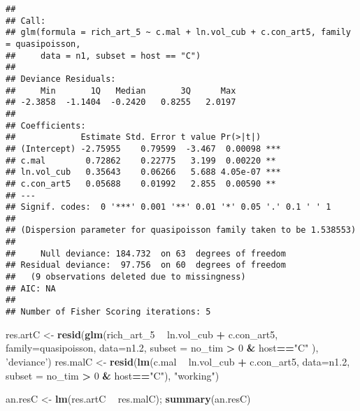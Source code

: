 \documentclass[]{article}
\newenvironment{Shaded}{\begin{snugshade}}{\end{snugshade}}
\newcommand{\KeywordTok}[1]{\textcolor[rgb]{0.13,0.29,0.53}{\textbf{#1}}}
\newcommand{\DataTypeTok}[1]{\textcolor[rgb]{0.13,0.29,0.53}{#1}}
\newcommand{\DecValTok}[1]{\textcolor[rgb]{0.00,0.00,0.81}{#1}}
\newcommand{\StringTok}[1]{\textcolor[rgb]{0.31,0.60,0.02}{#1}}
\newcommand{\OperatorTok}[1]{\textcolor[rgb]{0.81,0.36,0.00}{\textbf{#1}}}
\newcommand{\NormalTok}[1]{#1}
\begin{document}
\begin{verbatim}
## 
## Call:
## glm(formula = rich_art_5 ~ c.mal + ln.vol_cub + c.con_art5, family = quasipoisson, 
##     data = n1, subset = host == "C")
## 
## Deviance Residuals: 
##     Min       1Q   Median       3Q      Max  
## -2.3858  -1.1404  -0.2420   0.8255   2.0197  
## 
## Coefficients:
##             Estimate Std. Error t value Pr(>|t|)    
## (Intercept) -2.75955    0.79599  -3.467  0.00098 ***
## c.mal        0.72862    0.22775   3.199  0.00220 ** 
## ln.vol_cub   0.35643    0.06266   5.688 4.05e-07 ***
## c.con_art5   0.05688    0.01992   2.855  0.00590 ** 
## ---
## Signif. codes:  0 '***' 0.001 '**' 0.01 '*' 0.05 '.' 0.1 ' ' 1
## 
## (Dispersion parameter for quasipoisson family taken to be 1.538553)
## 
##     Null deviance: 184.732  on 63  degrees of freedom
## Residual deviance:  97.756  on 60  degrees of freedom
##   (9 observations deleted due to missingness)
## AIC: NA
## 
## Number of Fisher Scoring iterations: 5
\end{verbatim}

\begin{Shaded}
\begin{Highlighting}[]
\NormalTok{res.artC <-}\StringTok{ }\KeywordTok{resid}\NormalTok{(}\KeywordTok{glm}\NormalTok{(rich_art_}\DecValTok{5} \OperatorTok{~}\StringTok{ }\NormalTok{ln.vol_cub }\OperatorTok{+}\StringTok{ }\NormalTok{c.con_art5,}
           \DataTypeTok{family=}\NormalTok{quasipoisson, }\DataTypeTok{data=}\NormalTok{n1.}\DecValTok{2}\NormalTok{, }\DataTypeTok{subset =}\NormalTok{ no_tim }\OperatorTok{>}\StringTok{ }\DecValTok{0} \OperatorTok{&}\StringTok{ }\NormalTok{host}\OperatorTok{==}\StringTok{"C"}\NormalTok{ ), }\StringTok{'deviance'}\NormalTok{)}
\NormalTok{res.malC <-}\StringTok{ }\KeywordTok{resid}\NormalTok{(}\KeywordTok{lm}\NormalTok{(c.mal }\OperatorTok{~}\StringTok{ }\NormalTok{ln.vol_cub }\OperatorTok{+}\StringTok{ }\NormalTok{c.con_art5,}
           \DataTypeTok{data=}\NormalTok{n1.}\DecValTok{2}\NormalTok{, }\DataTypeTok{subset =}\NormalTok{ no_tim }\OperatorTok{>}\StringTok{ }\DecValTok{0} \OperatorTok{&}\StringTok{ }\NormalTok{host}\OperatorTok{==}\StringTok{"C"}\NormalTok{), }\StringTok{"working"}\NormalTok{)}

\NormalTok{an.resC <-}\StringTok{ }\KeywordTok{lm}\NormalTok{(res.artC }\OperatorTok{~}\StringTok{ }\NormalTok{res.malC); }\KeywordTok{summary}\NormalTok{(an.resC)}
\end{Highlighting}
\end{Shaded}
\end{document}
